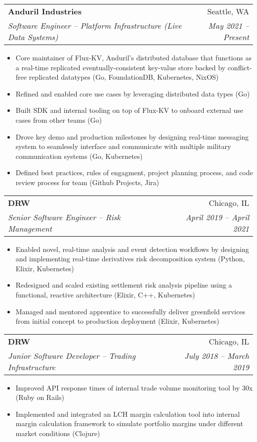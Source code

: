 \documentclass[letterpaper,11pt]{article}
\makeatletter
\newcommand{\resitem}[1]{\item #1 \vspace{-2pt}}
\newcommand{\ressubheading}[4]{
\begin{tabular*}{6.875in}{l@{\extracolsep{\fill}}r}
		\textbf{#1} & #2 \\
		\textit{#3} & \textit{#4} \\
\end{tabular*}\vspace{-6pt}}
\renewcommand{\footnotesize}{\fontsize{10pt}{11pt}\selectfont}
\makeatother
\begin{document}
		\begin{description}
			\item
			\ressubheading{Anduril Industries}{Seattle, WA}
			{Software Engineer -- Platform Infrastructure (Live Data Systems)}{May 2021 -- Present}
			{	
				\footnotesize
				\begin{itemize}
					\resitem{Core maintainer of Flux-KV, Anduril's distributed database that functions as a real-time replicated eventually-consistent key-value store backed by conflict-free replicated datatypes (Go, FoundationDB, Kubernetes, NixOS)}
					\resitem{Refined and enabled core use cases by leveraging distributed data types (Go)}
					\resitem{Built SDK and internal tooling on top of Flux-KV to onboard external use cases from other teams (Go)}
					\resitem{Drove key demo and production milestones by designing real-time messaging system to seamlessly interface and communicate with multiple military communication systems (Go, Kubernetes)}
					\resitem{Defined best practices, rules of engagment, project planning process, and code review process for team (Github Projects, Jira)}
				\end{itemize}
			}
			\item
			\ressubheading{DRW}{Chicago, IL}
			{Senior Software Engineer -- Risk Management}{April 2019 -- April 2021}
			{	
				\footnotesize
				\begin{itemize}
					\resitem{Enabled novel, real-time analysis and event detection workflows by designing and implementing real-time derivatives risk decomposition system  (Python, Elixir, Kubernetes)}
					\resitem{Redesigned and scaled existing settlement risk analysis pipeline using a functional, reactive architecture (Elixir, C++, Kubernetes)}
					\resitem{Managed and mentored apprentice to successfully deliver greenfield services from initial concept to production deployment (Elixir, Kubernetes)}
				\end{itemize}
			}
			\item
			\ressubheading{DRW}{Chicago, IL}
			{Junior Software Developer -- Trading Infrastructure}{July 2018 -- March 2019}
			{	
				\footnotesize
				\begin{itemize}
					\resitem{Improved API response times of internal trade volume monitoring tool by 30x (Ruby on Rails)}
					\resitem{Implemented and integrated an LCH margin calculation tool into internal margin calculation framework to simulate portfolio margins under different market conditions (Clojure)}
				\end{itemize}
			}
			\item 

\end{description}
\end{document}
